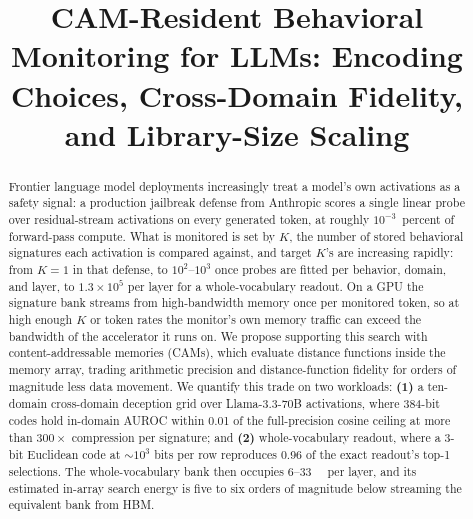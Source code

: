 \documentclass[conference]{IEEEtran}
\newcommand{\cam}{{CAM}\xspace}
\newcommand{\auroc}{{AUROC}\xspace}
\begin{document}

\title{\cam-Resident Behavioral Monitoring for LLMs: Encoding Choices,
Cross-Domain Fidelity, and Library-Size Scaling}

\author{
}

\maketitle

\begin{abstract}
Frontier language model deployments increasingly treat a model's own
activations as a safety signal: a production jailbreak defense from
Anthropic scores a single linear probe over residual-stream
activations on every generated token, at roughly $10^{-3}$~percent
of forward-pass compute. What is monitored is set by $K$, the number
of stored behavioral signatures each activation is compared against,
and target $K$'s are increasing rapidly: from $K=1$ in that defense,
to $10^{2}$--$10^{3}$ once probes are fitted per behavior, domain,
and layer, to $1.3\!\times\!10^{5}$ per layer for a whole-vocabulary
readout. On a GPU the signature bank streams from high-bandwidth
memory once per monitored token, so at high enough $K$ or token rates
the monitor's own memory traffic can exceed the bandwidth of the
accelerator it runs on. We propose supporting this search with
content-addressable memories (\cam{}s), which evaluate distance
functions inside the memory array, trading arithmetic precision and
distance-function fidelity for orders of magnitude less data
movement. We quantify this trade on two workloads: {\bf (1)} a
ten-domain cross-domain deception grid over Llama-3.3-70B
activations, where 384-bit codes hold in-domain \auroc within 0.01
of the full-precision cosine ceiling at more than $300\times$
compression per signature; and {\bf (2)} whole-vocabulary readout,
where a 3-bit Euclidean code at $\sim$$10^{3}$ bits per row
reproduces 0.96 of the exact readout's top-1 selections. The
whole-vocabulary bank then occupies 6--\qty{33}{\mega\byte} per
layer, and its estimated in-array search energy is five to six
orders of magnitude below streaming the equivalent bank from HBM.
\end{abstract}
\end{document}
